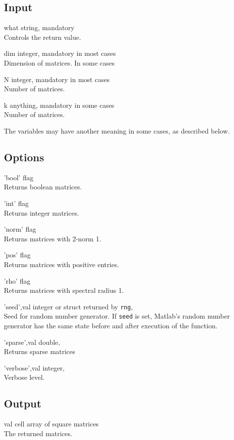 \subsection*{Input}
\begin{param}
\item[what] string, mandatory\\Controls the return value.
\item[dim] integer, mandatory in most cases\\Dimension of matrices. In some cases 
\item[N] integer, mandatory in most cases\\Number of matrices.
\item[k] anything, mandatory in some cases\\Number of matrices.
\end{param}
The variables may have another meaning in some cases, as described below.
\subsection*{Options}

\begin{param}
\item['bool'] flag\\Returns boolean matrices.
\item['int'] flag\\Returns integer matrices.
\item['norm'] flag\\Returns matrices with 2-norm 1.
\item['pos'] flag\\Returns matrices with positive entries.
\item['rho'] flag\\Returns matrices with spectral radius 1.
\item['seed',val] integer or struct returned by \texttt{rng}, \\Seed for random number generator. 
If \texttt{seed} is set, Matlab's random number generator has the same state before and after execution of the function.
\item['sparse',val] double, \\Returns sparse matrices
\item['verbose',val] integer, \\Verbose level.
\end{param}

\subsection*{Output}
\begin{param}
\item[val] cell array of square matrices\\The returned matrices.
\end{param}


